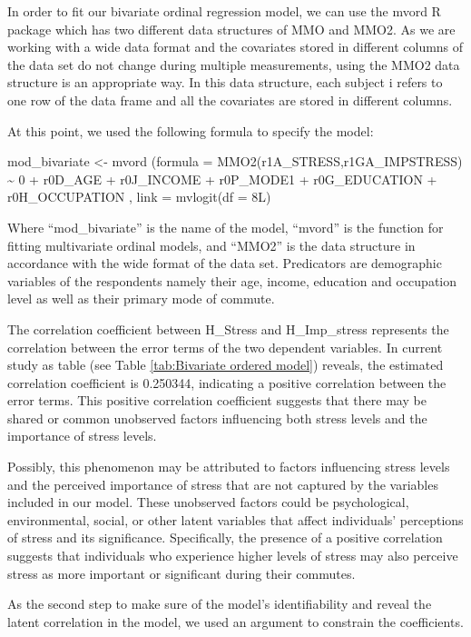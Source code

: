 \documentclass[
11pt, %
oneside, %
english, %
singlespacing, %
]{macthesis} %
\begin{document}
In order to fit our bivariate ordinal regression model, we can use the mvord R package which has two different data structures of MMO and MMO2. As we are working with a wide data format and the covariates stored in different columns of the data set do not change during multiple measurements, using the MMO2 data structure is an appropriate way. In this data structure, each subject i refers to one row of the data frame and all the covariates are stored in different columns.

At this point, we used the following formula to specify the model:

mod\_bivariate \textless- mvord (formula = MMO2(r1A\_STRESS,r1GA\_IMPSTRESS) \textasciitilde{} 0 + r0D\_AGE + r0J\_INCOME + r0P\_MODE1 + r0G\_EDUCATION + r0H\_OCCUPATION ,
link = mvlogit(df = 8L)

Where ``mod\_bivariate'' is the name of the model, ``mvord'' is the function for fitting multivariate ordinal models, and ``MMO2'' is the data structure in accordance with the wide format of the data set. Predicators are demographic variables of the respondents namely their age, income, education and occupation level as well as their primary mode of commute.

The correlation coefficient between H\_Stress and H\_Imp\_stress represents the correlation between the error terms of the two dependent variables. In current study as table (see Table \ref{tab:Bivariate ordered model}) reveals, the estimated correlation coefficient is 0.250344, indicating a positive correlation between the error terms. This positive correlation coefficient suggests that there may be shared or common unobserved factors influencing both stress levels and the importance of stress levels.

Possibly, this phenomenon may be attributed to factors influencing stress levels and the perceived importance of stress that are not captured by the variables included in our model. These unobserved factors could be psychological, environmental, social, or other latent variables that affect individuals' perceptions of stress and its significance. Specifically, the presence of a positive correlation suggests that individuals who experience higher levels of stress may also perceive stress as more important or significant during their commutes.

As the second step to make sure of the model's identifiability and reveal the latent correlation in the model, we used an argument to constrain the coefficients.
\end{document}

